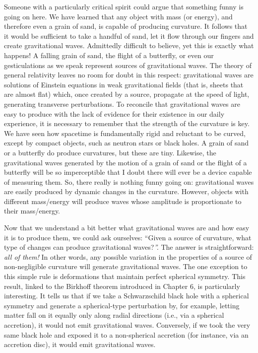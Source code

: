 Someone with a particularly critical spirit could argue that something funny is going on
here. We have learned that any object with mass (or energy), and therefore even a grain
of sand, is capable of producing curvature. It follows that it would be sufficient to
take a handful of sand, let it flow through our fingers and create gravitational
waves. Admittedly difficult to believe, yet this is exactly what
happens! A falling grain of sand, the flight of a butterfly, or even our gesticulations
as we speak represent sources of gravitational waves. The theory of general
relativity leaves no room for doubt in this respect: gravitational
waves are solutions of Einstein equations in weak gravitational fields (that is, sheets
that are almost flat) which, once created by a source, propagate at the speed of light,
generating transverse perturbations. To reconcile that gravitational waves are easy to
produce with the lack of evidence for their existence in our daily experience, it is
necessary to remember that the strength of the curvature is key. We have seen how
spacetime is fundamentally rigid and reluctant to be curved, except by compact objects,
such as neutron stars or black holes. A grain of sand or a butterfly do produce
curvatures, but these are tiny. Likewise, the gravitational waves generated by the
motion of a grain of sand or the flight of a butterfly will be so imperceptible that I
doubt there will ever be a device capable of measuring them. So, there really is nothing
funny going on: gravitational waves are easily produced by dynamic changes in the
curvature. However, objects with different mass/energy will produce
waves whose amplitude is proportionate to their mass/energy.

Now that we understand a bit better what gravitational waves are and
how easy it is to produce them, we could ask ourselves: ``Given a source of curvature,
what type of changes can produce gravitational waves?\emph{''.} The answer is
straightforward: \emph{all of them!} In other words, any possible variation in the
properties of a source of non-negligible curvature will generate gravitational waves.
The one exception to this simple rule is deformations that maintain perfect spherical
symmetry. This result, linked to the Birkhoff theorem introduced in
Chapter 6, is particularly interesting. It tells us that if we take a Schwarzschild
black hole with a spherical symmetry and generate
a spherical-type perturbation by, for example, letting matter fall on it equally only
along radial directions (i.e., via a spherical accretion), it would not emit
gravitational waves. Conversely, if we took the very same black hole and exposed it to a
non-spherical accretion (for instance, via an accretion disc), it would emit
gravitational waves.


